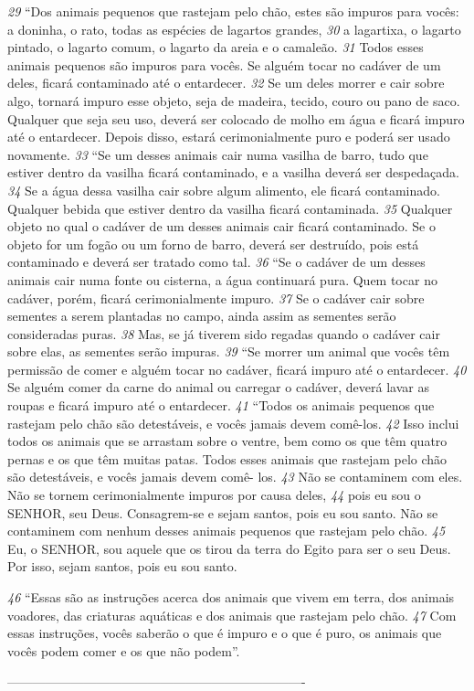 \smallskip
\textit{\tiny 29}
“Dos animais pequenos que rastejam pelo chão, estes são impuros para vocês:
a doninha, o rato, todas as espécies de lagartos grandes, 
\textit{\tiny 30}
a lagartixa, o lagarto
pintado, o lagarto comum, o lagarto da areia e o camaleão. 
\textit{\tiny 31}
Todos esses animais
pequenos são impuros para vocês. Se alguém tocar no cadáver de um deles, ficará
contaminado até o entardecer. 
\textit{\tiny 32}
Se um deles morrer e cair sobre algo, tornará
impuro esse objeto, seja de madeira, tecido, couro ou pano de saco. Qualquer que
seja seu uso, deverá ser colocado de molho em água e ficará impuro até o
entardecer. Depois disso, estará cerimonialmente puro e poderá ser usado
novamente.
\textit{\tiny 33}
“Se um desses animais cair numa vasilha de barro, tudo que estiver dentro da
vasilha ficará contaminado, e a vasilha deverá ser despedaçada. 
\textit{\tiny 34}
Se a água dessa
vasilha cair sobre algum alimento, ele ficará contaminado. Qualquer bebida que
estiver dentro da vasilha ficará contaminada. 
\textit{\tiny 35}
Qualquer objeto no qual o cadáver
de um desses animais cair ficará contaminado. Se o objeto for um fogão ou um
forno de barro, deverá ser destruído, pois está contaminado e deverá ser tratado
como tal.
\textit{\tiny 36}
“Se o cadáver de um desses animais cair numa fonte ou cisterna, a água
continuará pura. Quem tocar no cadáver, porém, ficará cerimonialmente impuro.
\textit{\tiny 37}
Se o cadáver cair sobre sementes a serem plantadas no campo, ainda assim as
sementes serão consideradas puras. 
\textit{\tiny 38}
Mas, se já tiverem sido regadas quando o
cadáver cair sobre elas, as sementes serão impuras.
\textit{\tiny 39}
“Se morrer um animal que vocês têm permissão de comer e alguém tocar no
cadáver, ficará impuro até o entardecer. 
\textit{\tiny 40}
Se alguém comer da carne do animal
ou carregar o cadáver, deverá lavar as roupas e ficará impuro até o entardecer.
\textit{\tiny 41}
“Todos os animais pequenos que rastejam pelo chão são detestáveis, e vocês
jamais devem comê-los. 
\textit{\tiny 42}
Isso inclui todos os animais que se arrastam sobre o
ventre, bem como os que têm quatro pernas e os que têm muitas patas. Todos
esses animais que rastejam pelo chão são detestáveis, e vocês jamais devem comê-
los. 
\textit{\tiny 43}
Não se contaminem com eles. Não se tornem cerimonialmente impuros por
causa deles, 
\textit{\tiny 44}
pois eu sou o SENHOR, seu Deus. Consagrem-se e sejam santos, pois
eu sou santo. Não se contaminem com nenhum desses animais pequenos que
rastejam pelo chão. 
\textit{\tiny 45}
Eu, o SENHOR, sou aquele que os tirou da terra do Egito para
ser o seu Deus. Por isso, sejam santos, pois eu sou santo.

\smallskip
\textit{\tiny 46}
“Essas são as instruções acerca dos animais que vivem em terra, dos animais
voadores, das criaturas aquáticas e dos animais que rastejam pelo chão. 
\textit{\tiny 47}
Com
essas instruções, vocês saberão o que é impuro e o que é puro, os animais que
vocês podem comer e os que não podem”.



----------------------------------------------------------------------
